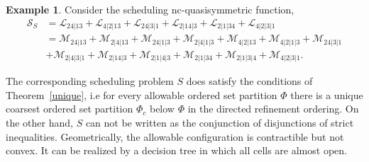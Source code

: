 \documentclass[12pt,reqno]{amsart}
\numberwithin{definition}{section}
\newtheorem{proposition}[definition]{Proposition}
\theoremstyle{definition}
\newtheorem{example}[definition]{Example}
\newcommand{\SSS}{\mathcal{S}}
\newcommand{\floor}[1]{\lfloor {#1} \rfloor}
\newcommand{\ceil}[1]{\lceil {#1} \rceil}
\newcommand{\ncM}{\mathcal{M}}
\newcommand{\ncL}{\mathcal{L}}
\newcommand{\poly}{\chi} %
\newcommand{\comment}[1]{\textsf{\footnotesize #1}}
\begin{document}
\begin{example} 
Consider the scheduling nc-quasisymmetric function,
\begin{align*}
\SSS_S & = \ncL_{24|13} + \ncL_{4|2|13} + \ncL_{24|3|1} + \ncL_{2|14|3} + \ncL_{2|1|34} + \ncL_{4|2|3|1}\\
& = \ncM_{24|13} + \ncM_{2|4|13} + \ncM_{24|1|3} + \ncM_{2|4|1|3} + \ncM_{4|2|13} + \ncM_{4|2|1|3} + \ncM_{24|3|1}\\
& + \ncM_{2|4|3|1} + \ncM_{2|14|3} + \ncM_{2|1|4|3} + \ncM_{2|1|34} + \ncM_{2|1|3|4} + \ncM_{4|2|3|1}.
\end{align*}

The corresponding scheduling problem $S$ does satisfy the conditions of Theorem~\ref{unique}, i.e for every allowable ordered set partition $\Phi$ there is a unique coarsest ordered set partition $\Phi_c$ below $\Phi$ in the directed refinement ordering.  On the other hand, $S$ can not be written as the conjunction of disjunctions of strict inequalities. Geometrically, the allowable configuration is contractible but not convex. It can be realized by a decision tree in which all cells are almost open.


\end{example}







\end{document}
